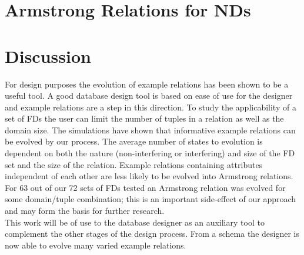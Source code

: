 \section{Armstrong Relations for NDs}


\section{Discussion}



For design purposes the evolution of example relations has been shown to
be a useful tool.  A good database
design tool is based on ease of use for the designer and example relations
are a step in this direction.  To  study the applicability of a set of FDs
 the user can limit the number of tuples in
a relation as well as the domain size. The simulations have shown that 
informative example relations can be evolved by our process.  The 
average number of states to evolution is dependent on both
the nature (non-interfering or interfering) and size of the FD set and the size of the relation.
Example relations containing attributes independent of each other
are less likely to be evolved into Armstrong relations. For 63 out
of our 72 sets of FDs tested an Armstrong relation was evolved
for some domain/tuple combination; this is an important side-effect
of our approach and may form the basis for further research.\\

This work
will be of use to the database designer as an auxiliary tool to complement
the other stages of the design process.  From a schema the designer is now
 able to evolve many varied example relations.\\

